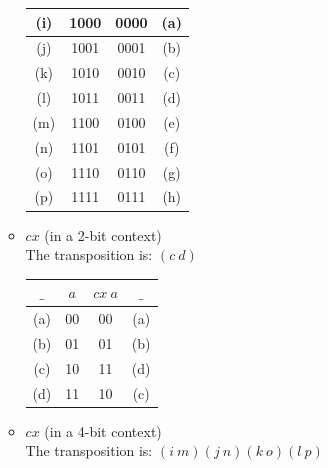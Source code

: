 \documentclass[11pt]{article}
\begin{document}
\begin{enumerate}
\begin{itemize}
\begin{tabular}{c|c|c|c}
		(i) & 1000 & 0000 & (a) \\ 
	\hline                             
		(j) & 1001 & 0001 & (b) \\ 
	\hline                             
		(k) & 1010 & 0010 & (c) \\ 
	\hline                             
		(l) & 1011 & 0011 & (d) \\ 
	\hline                             
		(m) & 1100 & 0100 & (e) \\ 
	\hline                             
		(n) & 1101 & 0101 & (f) \\ 
	\hline                             
		(o) & 1110 & 0110 & (g) \\ 
	\hline                             
		(p) & 1111 & 0111 & (h) \\ 
	\end{tabular}

	\newpage
	\item $cx$ (in a 2-bit context) \\
	The transposition is: $(c\ d)$  \\

	\begin{tabular}{c|c|c|c}
		$\_$ & $a$ & $cx\ a$ & $\_$ \\
	\hline
		(a) & 00 & 00 & (a) \\
	\hline
		(b) & 01 & 01 & (b) \\
	\hline 
		(c) & 10 & 11 & (d) \\
	\hline 
		(d) & 11 & 10 & (c) \\
	\end{tabular}


	\vspace{0.3in}

	\item $cx$ (in a 4-bit context) \\
	The transposition is: $(i\ m) (j\ n) (k\ o) (l\ p)$  \\


\end{itemize}
\end{enumerate}
\end{document}
